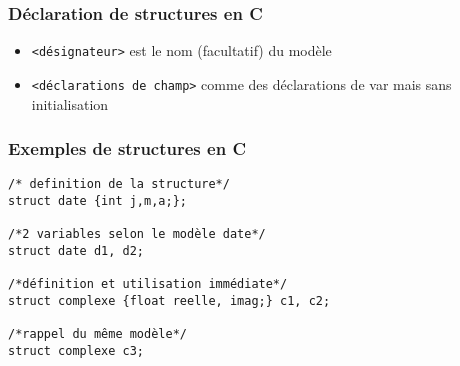 \documentclass[table,handout,tikz,12pt,svgnames]{beamer}
\begin{document}
\begin{frame}[fragile=singleslide]
	\frametitle{Déclaration de structures en C}
	\begin{itemize}
		où:
		\item \texttt{<désignateur>} est le nom (facultatif) du modèle
		\item \texttt{<déclarations de champ>} comme des déclarations de var mais sans initialisation
	\end{itemize}
\end{frame}


\begin{frame}[fragile=singleslide]
	\frametitle{Exemples de structures en C}
	\begin{verbatim} 
/* definition de la structure*/
struct date {int j,m,a;}; 

/*2 variables selon le modèle date*/
struct date d1, d2;

/*définition et utilisation immédiate*/
struct complexe {float reelle, imag;} c1, c2;

/*rappel du même modèle*/
struct complexe c3;
	\end{verbatim}
\end{frame}

\end{document}
